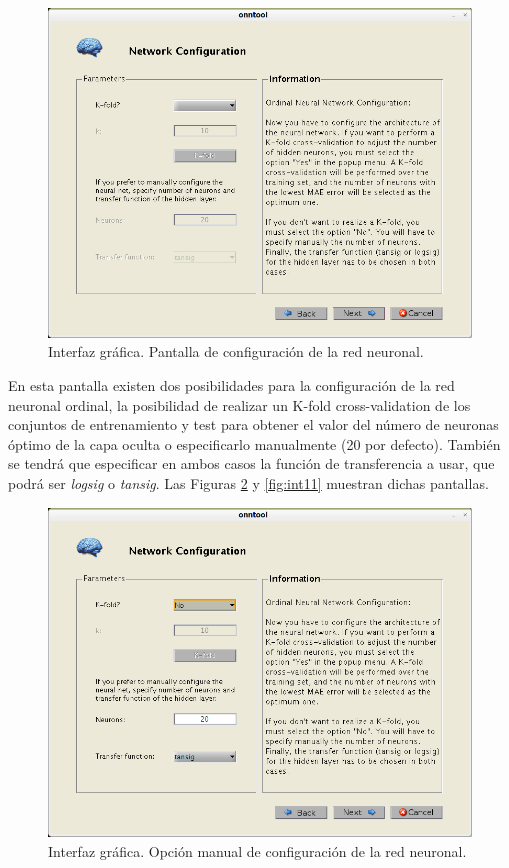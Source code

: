 		\begin{figure}[htbp]
			\centering
			\includegraphics[scale=0.5]{interfaz/interface09.png}
			\caption{Interfaz gráfica. Pantalla de configuración de la red neuronal.}
			\label{fig:int09}
		\end{figure}
		
		En esta pantalla existen dos posibilidades para la configuración de la red neuronal ordinal, la posibilidad de realizar un K-fold cross-validation de los conjuntos de entrenamiento y test para obtener el valor del número de neuronas óptimo de la capa oculta o especificarlo manualmente (20 por defecto). También se tendrá que especificar en ambos casos la función de transferencia a usar, que podrá ser \textit{logsig} o \textit{tansig}. Las Figuras \ref{fig:int10} y \ref{fig:int11} muestran dichas pantallas.\\
		
		\begin{figure}[htbp]
			\centering
			\includegraphics[scale=0.5]{interfaz/interface10.png}
			\caption{Interfaz gráfica. Opción manual de configuración de la red neuronal.}
			\label{fig:int10}
		\end{figure}
		

